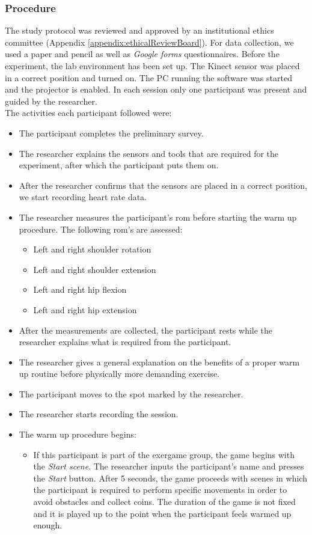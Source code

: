\subsubsection{Procedure}
The study protocol was reviewed and approved by an institutional ethics committee (Appendix \ref{appendix:ethicalReviewBoard}). For data collection, we used a  paper and pencil as well as \textit{Google forms} questionnaires. Before the experiment, the lab environment has been set up. The Kinect sensor was placed in a correct position and turned on. The PC running the software was started and the projector is enabled. In each session only one participant was present and guided by the researcher.\\The activities each participant followed were:
\begin{itemize}
\item The participant completes the preliminary survey.
\item The researcher explains the sensors and tools that are required for the experiment, after which the participant puts them on. 
\item After the researcher confirms that the sensors are placed in a correct position, we start recording heart rate data.
\item The researcher measures the participant's \acrshort{rom} before starting the warm up procedure. The following \acrshort{rom}'s are assessed: 
\begin{itemize}
\item Left and right shoulder rotation
\item Left and right shoulder extension
\item Left and right hip flexion
\item Left and right hip extension
\end{itemize}
\item After the measurements are collected, the participant rests while the researcher explains what is required from the participant.
\item The researcher gives a general explanation on the benefits of a proper warm up routine before physically more demanding exercise.
\item The participant moves to the spot marked by the researcher.
\item The researcher starts recording the session. 
\item The warm up procedure begins:
\begin{itemize}
\item If this participant is part of the exergame group, the game begins with the \textit{Start scene}. The researcher inputs the participant's name and presses the \textit{Start} button. After 5 seconds, the game proceeds with scenes in which the participant is required to perform specific movements in order to avoid obstacles and collect coins. The duration of the game is not fixed and it is played up to the point when the participant feels warmed up enough. 

\end{itemize}
\end{itemize}
